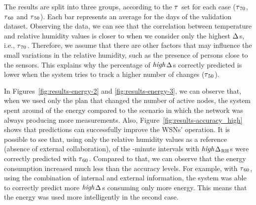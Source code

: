 \documentclass{llncs}
\newcommand{\ourDelta}[2][]{\ensuremath{\Delta\textsuperscript{\text{#1}}
\textsubscript{\text{#2}}}}
\newcommand{\high}[1][ ]{\ensuremath{\text{\emph{high}}#1}}
\newcommand{\highDelta}[2][]{\high{\ourDelta[#1]{#2}}}
\newcommand{\threshold}[1][]{\ensuremath{\tau\textsubscript{#1}}}
\begin{document}
\begin{comment}
To show better the benefits of the developed solution, we represent the 
collected results together with two baseline scenarios that did not use 
collaboration. In the first scenario the nodes always produced less 
measurements, and the opposite in the second one. Thus, by using them, we can 
show the lowest and the highest possible energy consumption values. An 
important remark is that these two scenarios always have , since either 
they did not save any energy (the highest consumption plan case) or their 
accuracy of detecting \highDelta{}s was zero (the lowest consumption plan case). 
Therefore, these plans can be considered as references and give some idea about 
how much our solution was able to exploit the trade-off between the two 
extremes.
\end{comment}

The results are split into three groups, according to the \threshold{} set for 
each case (\threshold[70], \threshold[60] and \threshold[50]). Each bar 
represents an average for the  days of the validation dataset. Observing the 
data, we can see that the correlation between temperature and relative humidity 
values is closer to  when we consider only the highest \ourDelta{}s, i.e., 
\threshold[70]. Therefore, we assume that there are other factors that may 
influence the small variations in the relative humidity, such as the presence of 
persons close to the sensors. This explains why the percentage of \highDelta{}s 
correctly predicted is lower when the system tries to track a higher number of 
changes (\threshold[50]).



In Figures~\ref{fig:results-energy-2} and \ref{fig:results-energy-3}, we 
can observe that, when we used only the plan that changed the number of active 
nodes, the system spent around  of the energy compared to the scenario in 
which the network was always producing more measurements. Also, 
Figure~\ref{fig:results-accuracy_high} shows that predictions can successfully 
improve the WSNs' operation. It is possible to see that, using only the relative 
humidity values as a reference (absence of external collaboration),  of 
the -minute intervals with \highDelta{RH}s were correctly predicted with 
\threshold[60]. Compared to that, we can observe that the energy consumption 
increased much less than the accuracy levels. For example, with \threshold[60], 
using the combination of internal and external information, the system was able 
to correctly predict  more \highDelta{}s consuming only  more 
energy. This means that the energy was used more intelligently in the second 
case.
\end{document}
